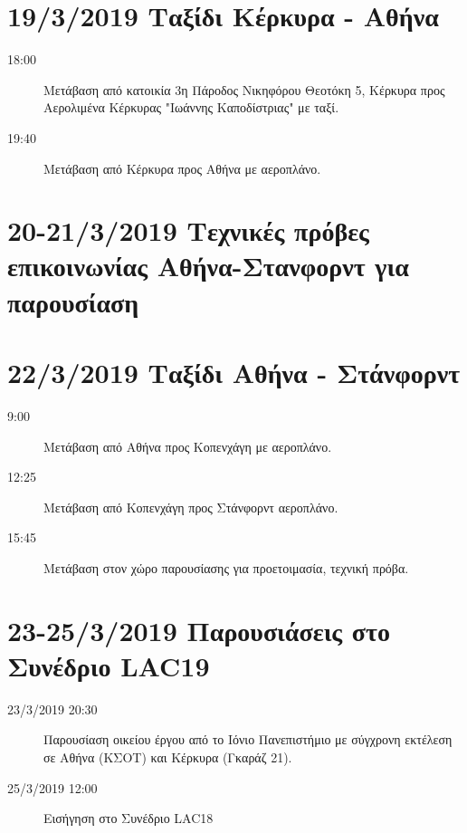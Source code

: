 \noindent
\maketitle

\section{19/3/2019 Ταξίδι Κέρκυρα - Αθήνα}
\label{sec:org47c9fab}

\begin{description}
\item[{18:00}] Μετάβαση από κατοικία 3η Πάροδος Νικηφόρου Θεοτόκη 5, Κέρκυρα προς Αερολιμένα Κέρκυρας "Ιωάννης Καποδίστριας" με ταξί.
\item[{19:40}] Μετάβαση από Κέρκυρα προς Αθήνα με αεροπλάνο.
\end{description}

\section{20-21/3/2019 Τεχνικές πρόβες επικοινωνίας Αθήνα-Στανφορντ για παρουσίαση}
\label{sec:org4832e55}

\section{22/3/2019 Ταξίδι Αθήνα - Στάνφορντ}
\label{sec:org5282a88}

\begin{description}
\item[{9:00}] Μετάβαση από Αθήνα προς Κοπενχάγη με αεροπλάνο.
\item[{12:25}] Μετάβαση από Κοπενχάγη προς Στάνφορντ αεροπλάνο.
\item[{15:45}] Μετάβαση στον χώρο παρουσίασης για προετοιμασία, τεχνική πρόβα.
\end{description}

\section{23-25/3/2019 Παρουσιάσεις στο Συνέδριο LAC19}
\label{sec:org5f3f6c5}

\begin{description}
\item[{23/3/2019 20:30}] Παρουσίαση οικείου έργου από το Ιόνιο Πανεπιστήμιο με σύγχρονη εκτέλεση σε Αθήνα (ΚΣΟΤ) και Κέρκυρα (Γκαράζ 21).

\item[{25/3/2019 12:00}] Εισήγηση στο Συνέδριο LAC18
\end{description}

